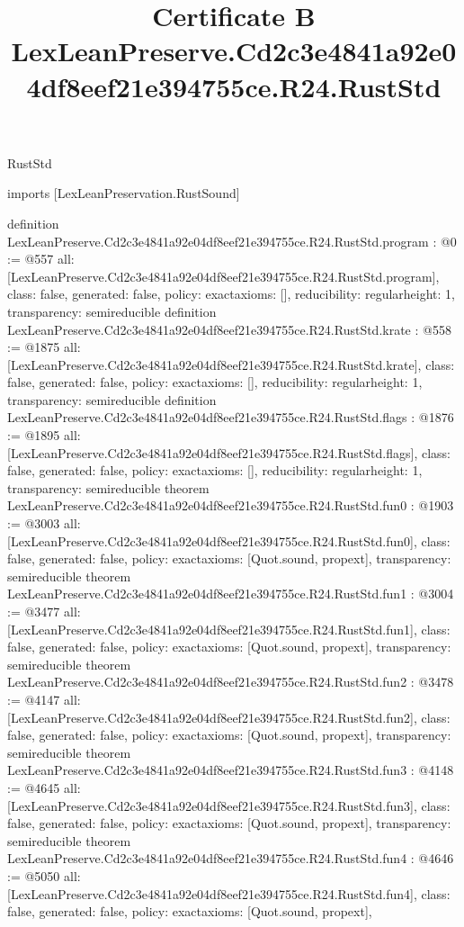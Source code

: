 \begin{lexlean}{RustStd}
\title{Certificate B LexLeanPreserve.Cd2c3e4841a92e04df8eef21e394755ce.R24.RustStd}
\begin{coremodule}
imports [LexLeanPreservation.RustSound]

definition LexLeanPreserve.Cd2c3e4841a92e04df8eef21e394755ce.R24.RustStd.program : @0 := @557 {
  all: [LexLeanPreserve.Cd2c3e4841a92e04df8eef21e394755ce.R24.RustStd.program],
  class: false,
  generated: false,
  policy: exact{axioms: []},
  reducibility: regular{height: 1},
  transparency: semireducible
}
definition LexLeanPreserve.Cd2c3e4841a92e04df8eef21e394755ce.R24.RustStd.krate : @558 := @1875 {
  all: [LexLeanPreserve.Cd2c3e4841a92e04df8eef21e394755ce.R24.RustStd.krate],
  class: false,
  generated: false,
  policy: exact{axioms: []},
  reducibility: regular{height: 1},
  transparency: semireducible
}
definition LexLeanPreserve.Cd2c3e4841a92e04df8eef21e394755ce.R24.RustStd.flags : @1876 := @1895 {
  all: [LexLeanPreserve.Cd2c3e4841a92e04df8eef21e394755ce.R24.RustStd.flags],
  class: false,
  generated: false,
  policy: exact{axioms: []},
  reducibility: regular{height: 1},
  transparency: semireducible
}
theorem LexLeanPreserve.Cd2c3e4841a92e04df8eef21e394755ce.R24.RustStd.fun0 : @1903 := @3003 {
  all: [LexLeanPreserve.Cd2c3e4841a92e04df8eef21e394755ce.R24.RustStd.fun0],
  class: false,
  generated: false,
  policy: exact{axioms: [Quot.sound, propext]},
  transparency: semireducible
}
theorem LexLeanPreserve.Cd2c3e4841a92e04df8eef21e394755ce.R24.RustStd.fun1 : @3004 := @3477 {
  all: [LexLeanPreserve.Cd2c3e4841a92e04df8eef21e394755ce.R24.RustStd.fun1],
  class: false,
  generated: false,
  policy: exact{axioms: [Quot.sound, propext]},
  transparency: semireducible
}
theorem LexLeanPreserve.Cd2c3e4841a92e04df8eef21e394755ce.R24.RustStd.fun2 : @3478 := @4147 {
  all: [LexLeanPreserve.Cd2c3e4841a92e04df8eef21e394755ce.R24.RustStd.fun2],
  class: false,
  generated: false,
  policy: exact{axioms: [Quot.sound, propext]},
  transparency: semireducible
}
theorem LexLeanPreserve.Cd2c3e4841a92e04df8eef21e394755ce.R24.RustStd.fun3 : @4148 := @4645 {
  all: [LexLeanPreserve.Cd2c3e4841a92e04df8eef21e394755ce.R24.RustStd.fun3],
  class: false,
  generated: false,
  policy: exact{axioms: [Quot.sound, propext]},
  transparency: semireducible
}
theorem LexLeanPreserve.Cd2c3e4841a92e04df8eef21e394755ce.R24.RustStd.fun4 : @4646 := @5050 {
  all: [LexLeanPreserve.Cd2c3e4841a92e04df8eef21e394755ce.R24.RustStd.fun4],
  class: false,
  generated: false,
  policy: exact{axioms: [Quot.sound, propext]},
}
\end{coremodule}
\end{lexlean}
